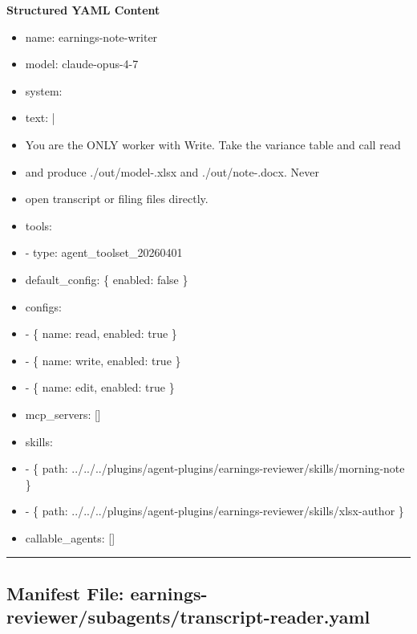 \documentclass[11pt]{article}
\begin{document}
\textbf{Structured YAML Content}
\begin{itemize}[leftmargin=*,itemsep=2pt,topsep=2pt]
\item {} name: earnings-note-writer
\item {} model: claude-opus-4-7
\item {} system:
\item {} text: |
\item {} You are the ONLY worker with Write. Take the variance table and call read
\item {} and produce ./out/model-.xlsx and ./out/note-.docx. Never
\item {} open transcript or filing files directly.
\item {} tools:
\item {} - type: agent\_\allowbreak{}toolset\_\allowbreak{}20260401
\item {} default\_\allowbreak{}config: \{ enabled: false \}
\item {} configs:
\item {} - \{ name: read, enabled: true \}
\item {} - \{ name: write, enabled: true \}
\item {} - \{ name: edit, enabled: true \}
\item {} mcp\_\allowbreak{}servers: []
\item {} skills:
\item {} - \{ path: ../../../plugins/agent-plugins/earnings-reviewer/skills/morning-note \}
\item {} - \{ path: ../../../plugins/agent-plugins/earnings-reviewer/skills/xlsx-author \}
\item {} callable\_\allowbreak{}agents: []
\end{itemize}

\vspace{0.8em}\hrule\vspace{0.8em}

\subsection{Manifest File: earnings-reviewer/subagents/transcript-reader.yaml}\label{file:earnings-reviewer-subagents-transcript-reader-yaml}
\end{document}
